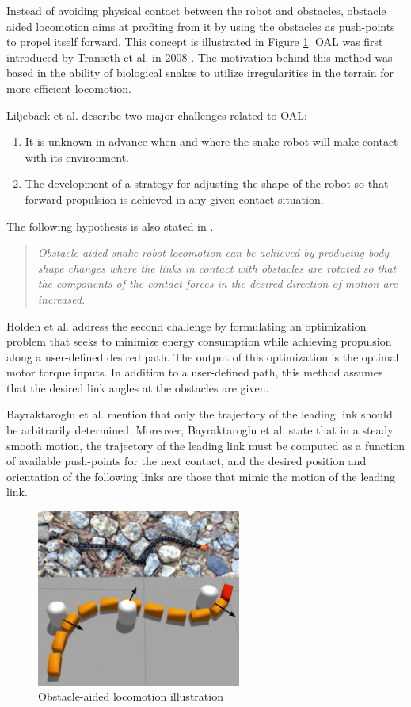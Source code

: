Instead of avoiding physical contact between the robot and obstacles, obstacle aided locomotion aims at profiting from it by using the obstacles as push-points to propel itself forward. This concept is illustrated in Figure \ref{fig:oal}. OAL was first introduced by Transeth et al. in 2008 \cite{transeth2008snake}. The motivation behind this method was based in the ability of biological snakes to utilize irregularities in the terrain for more efficient locomotion.

Liljebäck et al. \cite{liljeback2012snake} describe two major challenges related to OAL:
\begin{enumerate}
  \item It is unknown in advance when and where the snake robot will make contact with its environment.
  \item The development of a strategy for adjusting the shape of the robot so that forward propulsion is achieved in any given contact situation.
\end{enumerate}
The following hypothesis is also stated in \cite{liljeback2012snake}.
\begin{quote}
   \textit{ Obstacle-aided snake robot locomotion can be achieved by producing body shape changes where the links in contact with obstacles are rotated so that the components of the contact forces in the desired direction of motion are increased.}
\end{quote}

Holden et al. \cite{holden2014optimal} address the second challenge by formulating an optimization problem that seeks to minimize energy consumption while achieving propulsion along a user-defined desired path. The output of this optimization is the optimal motor torque inputs. In addition to a user-defined path, this method assumes that the desired link angles at the obstacles are given.

Bayraktaroglu et al. \cite{bayraktaroglu2004understanding} mention that only the trajectory of the leading link should be arbitrarily determined. Moreover, Bayraktaroglu et al. \cite{bayraktaroglu2004understanding} state that in a steady smooth motion, the trajectory of the leading link must be computed as a function of available push-points for the next contact, and the desired position and orientation of the following links are those that mimic the motion of the leading link.

\begin{figure}
    \centering
    \includegraphics[width=0.6\textwidth]{figures/theory/oal.PNG}
    \caption{Obstacle-aided locomotion illustration \cite{sanfilippo2017snakesim}}
    \label{fig:oal}
\end{figure}